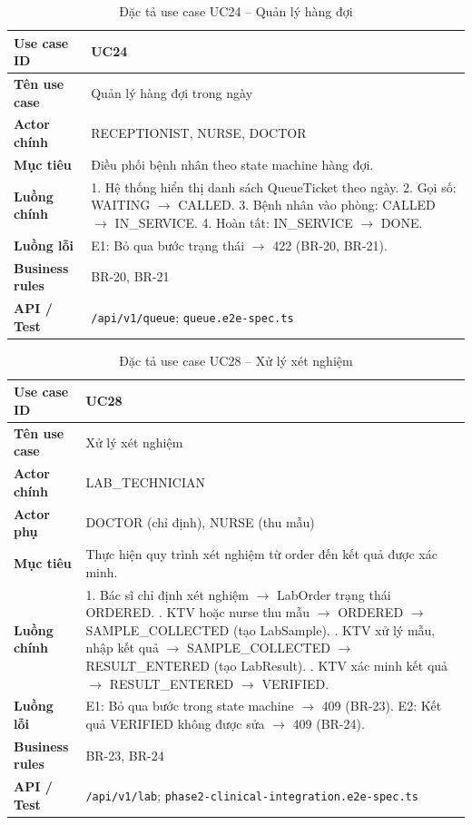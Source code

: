 \begin{table}[H]
\centering
\caption{Đặc tả use case UC24 -- Quản lý hàng đợi}
\label{tab:uc24}
\begin{tabularx}{\textwidth}{|p{3.6cm}|X|}
\hline
\textbf{Use case ID} & UC24 \\
\hline
\textbf{Tên use case} & Quản lý hàng đợi trong ngày \\
\hline
\textbf{Actor chính} & RECEPTIONIST, NURSE, DOCTOR \\
\hline
\textbf{Mục tiêu} & Điều phối bệnh nhân theo state machine hàng đợi. \\
\hline
\textbf{Luồng chính} & 1. Hệ thống hiển thị danh sách QueueTicket theo ngày. 2. Gọi số: WAITING $\rightarrow$ CALLED. 3. Bệnh nhân vào phòng: CALLED $\rightarrow$ IN\_SERVICE. 4. Hoàn tất: IN\_SERVICE $\rightarrow$ DONE. \\
\hline
\textbf{Luồng lỗi} & E1: Bỏ qua bước trạng thái $\rightarrow$ 422 (BR-20, BR-21). \\
\hline
\textbf{Business rules} & BR-20, BR-21 \\
\hline
\textbf{API / Test} & \texttt{/api/v1/queue}; \texttt{queue.e2e-spec.ts} \\
\hline
\end{tabularx}
\end{table}

\begin{table}[H]
\centering
\caption{Đặc tả use case UC28 -- Xử lý xét nghiệm}
\label{tab:uc28}
\begin{tabularx}{\textwidth}{|p{3.6cm}|X|}
\hline
\textbf{Use case ID} & UC28 \\
\hline
\textbf{Tên use case} & Xử lý xét nghiệm \\
\hline
\textbf{Actor chính} & LAB\_TECHNICIAN \\
\hline
\textbf{Actor phụ} & DOCTOR (chỉ định), NURSE (thu mẫu) \\
\hline
\textbf{Mục tiêu} & Thực hiện quy trình xét nghiệm từ order đến kết quả được xác minh. \\
\hline
\textbf{Luồng chính} &
1. Bác sĩ chỉ định xét nghiệm $\rightarrow$ LabOrder trạng thái ORDERED. \newline
2. KTV hoặc nurse thu mẫu $\rightarrow$ ORDERED $\rightarrow$ SAMPLE\_COLLECTED (tạo LabSample). \newline
3. KTV xử lý mẫu, nhập kết quả $\rightarrow$ SAMPLE\_COLLECTED $\rightarrow$ RESULT\_ENTERED (tạo LabResult). \newline
4. KTV xác minh kết quả $\rightarrow$ RESULT\_ENTERED $\rightarrow$ VERIFIED. \\
\hline
\textbf{Luồng lỗi} & E1: Bỏ qua bước trong state machine $\rightarrow$ 409 (BR-23). E2: Kết quả VERIFIED không được sửa $\rightarrow$ 409 (BR-24). \\
\hline
\textbf{Business rules} & BR-23, BR-24 \\
\hline
\textbf{API / Test} & \texttt{/api/v1/lab}; \texttt{phase2-clinical-integration.e2e-spec.ts} \\
\hline
\end{tabularx}
\end{table}

